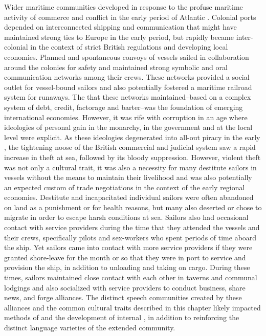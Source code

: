 {Wider maritime communities developed in response to the profuse maritime activity of commerce and conflict in the early period of Atlantic . Colonial ports depended on interconnected shipping and communication that might have maintained strong ties to Europe in the early period, but rapidly became inter-colonial in the context of strict British regulations and developing local economies. Planned and spontaneous convoys of vessels sailed in collaboration around the colonies for safety and maintained strong symbolic and oral communication networks among their crews. These networks provided a social outlet for vessel-bound sailors and also potentially fostered a maritime railroad system for runaways. The  that these networks maintained–based on a complex system of debt, credit, factorage and barter–was the foundation of emerging international economies. However, it was rife with corruption in an age where ideologies of personal gain in the monarchy, in the government and at the local level were explicit. As these ideologies degenerated into all-out piracy in the early , the tightening noose of the British commercial and judicial system saw a rapid increase in theft at sea, followed by its bloody suppression. However, violent theft was not only a cultural trait, it was also a necessity for many destitute sailors in vessels without the means to maintain their livelihood and was also potentially an expected custom of trade negotiations in the context of the early regional economies. Destitute and incapacitated individual sailors were often abandoned on land as a punishment or for health reasons, but many also deserted or chose to migrate in order to escape harsh conditions at sea. Sailors also had occasional contact with service providers during the time that they attended the vessels and their crews, specifically pilots and sex-workers who spent periods of time aboard the ship. Yet sailors came into contact with more service providers if they were granted shore-leave for the month or so that they were in port to service and provision the ship, in addition to unloading and taking on cargo. During these times, sailors maintained close contact with each other in taverns and communal lodgings and also socialized with service providers to conduct business, share news, and forge alliances. The distinct speech communities created by these alliances and the common cultural traits described in this chapter likely impacted methods of  and the development of internal , in addition to reinforcing the distinct language varieties of the extended  community. 
}
